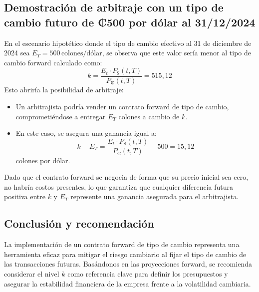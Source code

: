 \documentclass[12pt]{article}
\begin{document}
\subsection*{Demostración de arbitraje con un tipo de cambio futuro de ₡500 por dólar al 31/12/2024}

En el escenario hipotético donde el tipo de cambio efectivo al 31 de diciembre de 2024 sea \( E_T = 500 \, \text{colones/dólar} \), se observa que este valor sería menor al tipo de cambio forward calculado como:
\[
k = \frac{E_t \cdot P_{\text{\$}}(t, T)}{P_{\text{₡}}(t, T)} = 515,12
\]
Esto abriría la posibilidad de arbitraje:

\begin{itemize}
    \item Un arbitrajista podría vender un contrato forward de tipo de cambio, comprometiéndose a entregar \( E_T \) colones a cambio de \( k \).
    \item En este caso, se asegura una ganancia igual a:
    \[
    k - E_T = \frac{E_t \cdot P_{\text{\$}}(t, T)}{P_{\text{₡}}(t, T)} - 500 = 15,12
    \]
    colones por dólar.
\end{itemize}

Dado que el contrato forward se negocia de forma que su precio inicial sea cero, no habría costos presentes, lo que garantiza que cualquier diferencia futura positiva entre \( k \) y \( E_T \) represente una ganancia asegurada para el arbitrajista.

\subsection*{Conclusión y recomendación}

La implementación de un contrato forward de tipo de cambio representa una herramienta eficaz para mitigar el riesgo cambiario al fijar el tipo de cambio de las transacciones futuras. Basándonos en las proyecciones forward, se recomienda considerar el nivel \( k \) como referencia clave para definir los presupuestos y asegurar la estabilidad financiera de la empresa frente a la volatilidad cambiaria.


\end{document}
